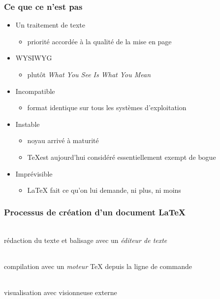 \begin{frame}

	\frametitle{Ce que ce n'est pas}
	
	\begin{itemize}
		
		\item Un traitement de texte
		\begin{itemize}
			\item priorité accordée à la qualité de la mise en page
		\end{itemize}
	
		\item WYSIWYG
		\begin{itemize}
			\item plutôt \emph{What You See Is What You Mean}
		\end{itemize}
	
		\item Incompatible
		\begin{itemize}
			\item format identique sur tous les systèmes d’exploitation
		\end{itemize}
	
		\item Instable
		\begin{itemize}
			\item noyau arrivé à maturité
			\item \TeX est aujourd’hui considéré essentiellement exempt de bogue
		\end{itemize}
	
		\item Imprévisible
		\begin{itemize}
			\item {\LaTeX} fait ce qu’on lui demande, ni plus, ni moins
		\end{itemize}
	\end{itemize}
\end{frame}


\begin{frame}[c]
	\frametitle{Processus de création d'un document {\LaTeX}}
	\Huge
	\begin{minipage}[t]{0.25\linewidth}
		\centering
		\faFileTextO \\ \bigskip
		\footnotesize
		rédaction du texte et balisage avec un \emph{éditeur de texte}
	\end{minipage}
	\hfill\faArrowRight\hfill
	\begin{minipage}[t]{0.25\linewidth}
		\centering
		\faCogs \\  \bigskip
		\footnotesize
		compilation avec un \emph{moteur} {\TeX} depuis la ligne de commande
	\end{minipage}
	\hfill\faArrowRight\hfill
	\begin{minipage}[t]{0.25\linewidth}
		\centering
		\faFilePdfO \\  \bigskip
		\footnotesize
		visualisation avec visionneuse externe
	\end{minipage}
	
\end{frame}

